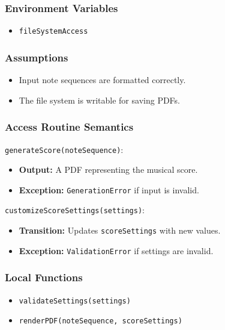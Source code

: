 \documentclass[12pt, titlepage]{article}
\begin{document}
\subsubsection{Environment Variables}  
\begin{itemize}  
    \item \texttt{fileSystemAccess}  
\end{itemize}  

\subsubsection{Assumptions}  
\begin{itemize}  
    \item Input note sequences are formatted correctly.  
    \item The file system is writable for saving PDFs.  
\end{itemize}  

\subsubsection{Access Routine Semantics}  

\noindent \texttt{generateScore(noteSequence)}:
\begin{itemize}  
    \item \textbf{Output:} A PDF representing the musical score.  
    \item \textbf{Exception:} \texttt{GenerationError} if input is invalid.  
\end{itemize}  

\noindent \texttt{customizeScoreSettings(settings)}:
\begin{itemize}  
    \item \textbf{Transition:} Updates \texttt{scoreSettings} with new values.  
    \item \textbf{Exception:} \texttt{ValidationError} if settings are invalid.  
\end{itemize}  

\subsubsection{Local Functions}  
\begin{itemize}  
    \item \texttt{validateSettings(settings)}  
    \item \texttt{renderPDF(noteSequence, scoreSettings)}  
\end{itemize}  
\end{document}
